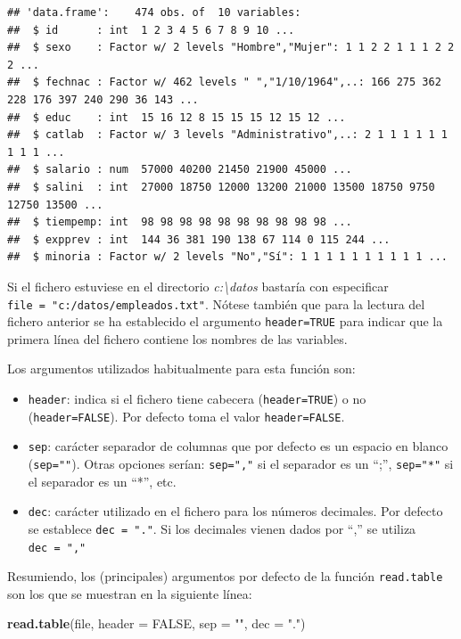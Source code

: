 \documentclass[]{book}
\newenvironment{Shaded}{\begin{snugshade}}{\end{snugshade}}
\newcommand{\KeywordTok}[1]{\textcolor[rgb]{0.13,0.29,0.53}{\textbf{#1}}}
\newcommand{\DataTypeTok}[1]{\textcolor[rgb]{0.13,0.29,0.53}{#1}}
\newcommand{\StringTok}[1]{\textcolor[rgb]{0.31,0.60,0.02}{#1}}
\newcommand{\OtherTok}[1]{\textcolor[rgb]{0.56,0.35,0.01}{#1}}
\newcommand{\NormalTok}[1]{#1}
\begin{document}
\begin{verbatim}
## 'data.frame':    474 obs. of  10 variables:
##  $ id      : int  1 2 3 4 5 6 7 8 9 10 ...
##  $ sexo    : Factor w/ 2 levels "Hombre","Mujer": 1 1 2 2 1 1 1 2 2 2 ...
##  $ fechnac : Factor w/ 462 levels " ","1/10/1964",..: 166 275 362 228 176 397 240 290 36 143 ...
##  $ educ    : int  15 16 12 8 15 15 15 12 15 12 ...
##  $ catlab  : Factor w/ 3 levels "Administrativo",..: 2 1 1 1 1 1 1 1 1 1 ...
##  $ salario : num  57000 40200 21450 21900 45000 ...
##  $ salini  : int  27000 18750 12000 13200 21000 13500 18750 9750 12750 13500 ...
##  $ tiempemp: int  98 98 98 98 98 98 98 98 98 98 ...
##  $ expprev : int  144 36 381 190 138 67 114 0 115 244 ...
##  $ minoria : Factor w/ 2 levels "No","Sí": 1 1 1 1 1 1 1 1 1 1 ...
\end{verbatim}

Si el fichero estuviese en el directorio \emph{c:\textbackslash{}datos}
bastaría con especificar \texttt{file\ =\ "c:/datos/empleados.txt"}.
Nótese también que para la lectura del fichero anterior se ha
establecido el argumento \texttt{header=TRUE} para indicar que la
primera línea del fichero contiene los nombres de las variables.

Los argumentos utilizados habitualmente para esta función son:

\begin{itemize}
\item
  \texttt{header}: indica si el fichero tiene cabecera
  (\texttt{header=TRUE}) o no (\texttt{header=FALSE}). Por defecto toma
  el valor \texttt{header=FALSE}.
\item
  \texttt{sep}: carácter separador de columnas que por defecto es un
  espacio en blanco (\texttt{sep=""}). Otras opciones serían:
  \texttt{sep=","} si el separador es un ``;'', \texttt{sep="*"} si el
  separador es un ``*'', etc.
\item
  \texttt{dec}: carácter utilizado en el fichero para los números
  decimales. Por defecto se establece \texttt{dec\ =\ "."}. Si los
  decimales vienen dados por ``,'' se utiliza \texttt{dec\ =\ ","}
\end{itemize}

Resumiendo, los (principales) argumentos por defecto de la función
\texttt{read.table} son los que se muestran en la siguiente línea:

\begin{Shaded}
\begin{Highlighting}[]
\KeywordTok{read.table}\NormalTok{(file, }\DataTypeTok{header =} \OtherTok{FALSE}\NormalTok{, }\DataTypeTok{sep =} \StringTok{""}\NormalTok{, }\DataTypeTok{dec =} \StringTok{"."}\NormalTok{)  }
\end{Highlighting}
\end{Shaded}
\end{document}

